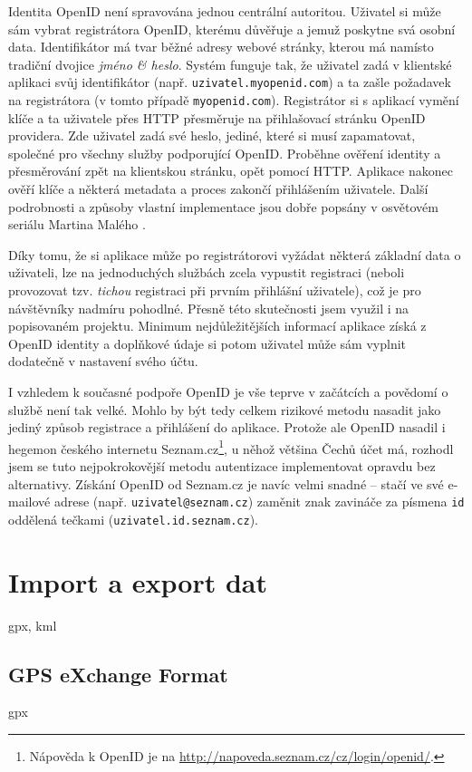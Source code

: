 Identita OpenID není spravována jednou centrální autoritou. Uživatel
si může sám vybrat registrátora OpenID, kterému důvěřuje a jemuž
poskytne svá osobní data. Identifikátor má tvar běžné adresy webové
stránky, kterou má namísto tradiční dvojice {\it jméno \& heslo}.
Systém funguje tak, že uživatel zadá v klientské aplikaci svůj
identifikátor (např. {\tt uzivatel.myopenid.com}) a ta zašle
požadavek na registrátora (v tomto případě {\tt myopenid.com}).
Registrátor si s aplikací vymění klíče a ta uživatele přes HTTP
přesměruje na přihlašovací stránku OpenID providera. Zde uživatel
zadá své heslo, jediné, které si musí zapamatovat, společné pro
všechny služby podporující OpenID. Proběhne ověření identity a
přesměrování zpět na klientskou stránku, opět pomocí HTTP. Aplikace
nakonec ověří klíče a některá metadata a proces zakončí přihlášením
uživatele. Další podrobnosti a způsoby vlastní implementace jsou
dobře popsány v osvětovém seriálu Martina Malého \cite{openid}.

Díky tomu, že si aplikace může po registrátorovi vyžádat některá
základní data o uživateli, lze na jednoduchých službách zcela
vypustit registraci (neboli provozovat tzv. {\it tichou} registraci
při prvním přihlášní uživatele), což je pro návštěvníky nadmíru
pohodlné. Přesně této skutečnosti jsem využil i na popisovaném
projektu. Minimum nejdůležitějších informací aplikace získá z OpenID
identity a doplňkové údaje si potom uživatel může sám vyplnit
dodatečně v nastavení svého účtu.

I vzhledem k současné podpoře OpenID je vše teprve v začátcích a
povědomí o službě není tak velké. Mohlo by být tedy celkem rizikové
metodu nasadit jako jediný způsob registrace a přihlášení do aplikace.
Protože ale OpenID nasadil i hegemon českého internetu
Seznam.cz\footnote{Nápověda
k OpenID je na \url{http://napoveda.seznam.cz/cz/login/openid/}.}, u
něhož většina Čechů účet má, rozhodl jsem se tuto nejpokrokovější metodu autentizace implementovat opravdu bez alternativy. Získání
OpenID od Seznam.cz je navíc velmi snadné -- stačí ve své e-mailové
adrese (např. {\tt uzivatel@seznam.cz}) zaměnit znak zavináče za
písmena {\tt id} oddělená tečkami ({\tt uzivatel.id.seznam.cz}).

\section{Import a export dat}
gpx, kml
\subsection{GPS eXchange Format}
gpx
